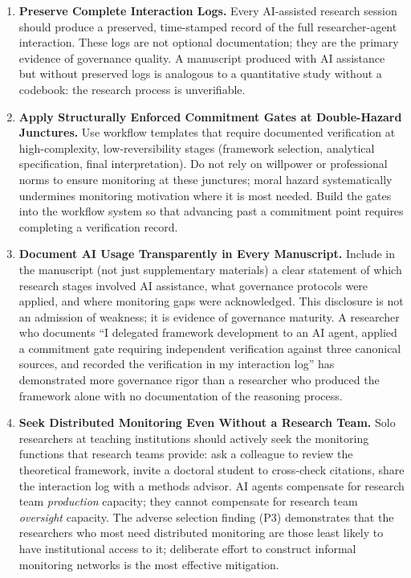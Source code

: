 \documentclass[12pt]{article}
\begin{document}
\begin{enumerate}\setlength{\itemsep}{6pt}

\item \textbf{Preserve Complete Interaction Logs.}
Every AI-assisted research session should produce a preserved, time-stamped record of the
full researcher-agent interaction. These logs are not optional documentation; they are the
primary evidence of governance quality. A manuscript produced with AI assistance but without
preserved logs is analogous to a quantitative study without a codebook: the research
process is unverifiable.

\item \textbf{Apply Structurally Enforced Commitment Gates at Double-Hazard Junctures.}
Use workflow templates that require documented verification at high-complexity,
low-reversibility stages (framework selection, analytical specification, final
interpretation). Do not rely on willpower or professional norms to ensure monitoring at
these junctures; moral hazard systematically undermines monitoring motivation where it is
most needed. Build the gates into the workflow system so that advancing past a commitment
point requires completing a verification record.

\item \textbf{Document AI Usage Transparently in Every Manuscript.}
Include in the manuscript (not just supplementary materials) a clear statement of which
research stages involved AI assistance, what governance protocols were applied, and where
monitoring gaps were acknowledged. This disclosure is not an admission of weakness; it is
evidence of governance maturity. A researcher who documents ``I delegated framework
development to an AI agent, applied a commitment gate requiring independent verification
against three canonical sources, and recorded the verification in my interaction log'' has
demonstrated more governance rigor than a researcher who produced the framework alone with
no documentation of the reasoning process.

\item \textbf{Seek Distributed Monitoring Even Without a Research Team.}
Solo researchers at teaching institutions should actively seek the monitoring functions that
research teams provide: ask a colleague to review the theoretical framework, invite a
doctoral student to cross-check citations, share the interaction log with a methods advisor.
AI agents compensate for research team \emph{production} capacity; they cannot compensate
for research team \emph{oversight} capacity. The adverse selection finding (P3) demonstrates
that the researchers who most need distributed monitoring are those least likely to have
institutional access to it; deliberate effort to construct informal monitoring networks is
the most effective mitigation.


\end{enumerate}
\end{document}
